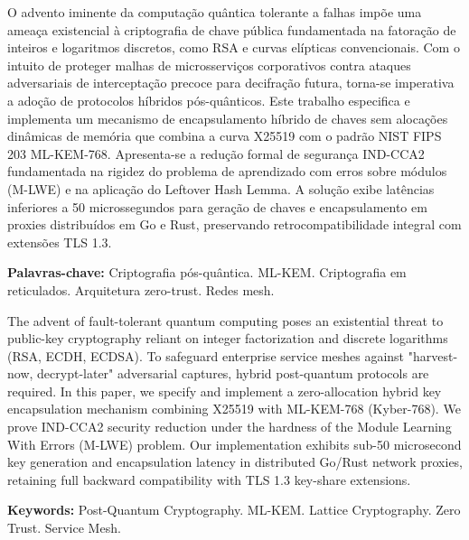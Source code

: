 \documentclass[
  article,
  12pt,
  oneside,
  a4paper,
  english,
  brazil
]{abntex2}
\begin{document}

\maketitle

\begin{resumoumacoluna}
O advento iminente da computação quântica tolerante a falhas impõe uma ameaça existencial à criptografia de chave pública fundamentada na fatoração de inteiros e logaritmos discretos, como RSA e curvas elípticas convencionais. Com o intuito de proteger malhas de microsserviços corporativos contra ataques adversariais de interceptação precoce para decifração futura, torna-se imperativa a adoção de protocolos híbridos pós-quânticos. Este trabalho especifica e implementa um mecanismo de encapsulamento híbrido de chaves sem alocações dinâmicas de memória que combina a curva X25519 com o padrão NIST FIPS 203 ML-KEM-768. Apresenta-se a redução formal de segurança IND-CCA2 fundamentada na rigidez do problema de aprendizado com erros sobre módulos (M-LWE) e na aplicação do Leftover Hash Lemma. A solução exibe latências inferiores a 50 microssegundos para geração de chaves e encapsulamento em proxies distribuídos em Go e Rust, preservando retrocompatibilidade integral com extensões TLS 1.3.

\vspace{\onelineskip}
\noindent
\textbf{Palavras-chave:} Criptografia pós-quântica. ML-KEM. Criptografia em reticulados. Arquitetura zero-trust. Redes mesh.
\end{resumoumacoluna}

\begin{resumoumacoluna}[Abstract]
The advent of fault-tolerant quantum computing poses an existential threat to public-key cryptography reliant on integer factorization and discrete logarithms (RSA, ECDH, ECDSA). To safeguard enterprise service meshes against "harvest-now, decrypt-later" adversarial captures, hybrid post-quantum protocols are required. In this paper, we specify and implement a zero-allocation hybrid key encapsulation mechanism combining X25519 with ML-KEM-768 (Kyber-768). We prove IND-CCA2 security reduction under the hardness of the Module Learning With Errors (M-LWE) problem. Our implementation exhibits sub-50 microsecond key generation and encapsulation latency in distributed Go/Rust network proxies, retaining full backward compatibility with TLS 1.3 key-share extensions.

\vspace{\onelineskip}
\noindent
\textbf{Keywords:} Post-Quantum Cryptography. ML-KEM. Lattice Cryptography. Zero Trust. Service Mesh.
\end{resumoumacoluna}
\end{document}
